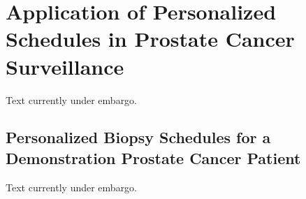 \section{Application of Personalized Schedules in Prostate Cancer Surveillance}
\label{c4:sec:results}
Text currently under embargo.

\subsection{Personalized Biopsy Schedules for a Demonstration Prostate Cancer Patient}
\label{c4:subsec:demo_patient}
Text currently under embargo.